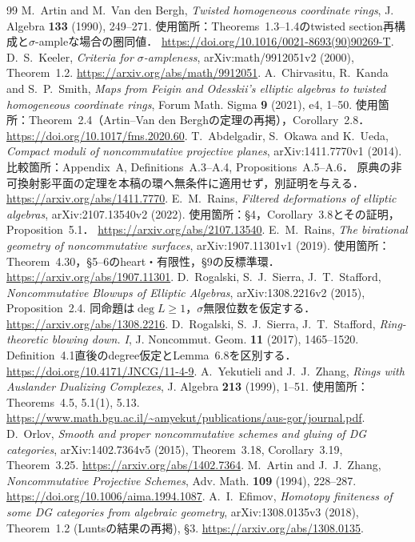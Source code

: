 \documentclass[11pt,a4paper]{ltjsarticle}
\theoremstyle{definition}
\begin{document}
\begin{thebibliography}{99}
M.~Artin and M.~Van den Bergh,
\emph{Twisted homogeneous coordinate rings},
J. Algebra \textbf{133} (1990), 249--271.
使用箇所：Theorems~1.3--1.4のtwisted section再構成と$\sigma$-ampleな場合の圏同値．
\url{https://doi.org/10.1016/0021-8693(90)90269-T}.
D.~S.~Keeler, \emph{Criteria for $\sigma$-ampleness},
arXiv:math/9912051v2 (2000), Theorem~1.2.
\url{https://arxiv.org/abs/math/9912051}.
A.~Chirvasitu, R.~Kanda and S.~P.~Smith,
\emph{Maps from Feigin and Odesskii's elliptic algebras to twisted homogeneous coordinate rings},
Forum Math. Sigma \textbf{9} (2021), e4, 1--50.
使用箇所：Theorem~2.4（Artin--Van den Berghの定理の再掲），Corollary~2.8．
\url{https://doi.org/10.1017/fms.2020.60}.
T.~Abdelgadir, S.~Okawa and K.~Ueda,
\emph{Compact moduli of noncommutative projective planes},
arXiv:1411.7770v1 (2014).
比較箇所：Appendix~A, Definitions~A.3--A.4, Propositions~A.5--A.6．
原典の非可換射影平面の定理を本稿の環へ無条件に適用せず，別証明を与える．
\url{https://arxiv.org/abs/1411.7770}.
E.~M.~Rains, \emph{Filtered deformations of elliptic algebras},
arXiv:2107.13540v2 (2022).
使用箇所：\S4，Corollary~3.8とその証明，Proposition~5.1．
\url{https://arxiv.org/abs/2107.13540}.
E.~M.~Rains, \emph{The birational geometry of noncommutative surfaces},
arXiv:1907.11301v1 (2019).
使用箇所：Theorem~4.30，\S5--6のheart・有限性，\S9の反標準環．
\url{https://arxiv.org/abs/1907.11301}.
D.~Rogalski, S.~J.~Sierra, J.~T.~Stafford,
\emph{Noncommutative Blowups of Elliptic Algebras},
arXiv:1308.2216v2 (2015), Proposition~2.4.
同命題は$\deg L\geq1$，$\sigma$無限位数を仮定する．
\url{https://arxiv.org/abs/1308.2216}.
D.~Rogalski, S.~J.~Sierra, J.~T.~Stafford,
\emph{Ring-theoretic blowing down. I},
J. Noncommut. Geom. \textbf{11} (2017), 1465--1520.
Definition~4.1直後のdegree仮定とLemma~6.8を区別する．
\url{https://doi.org/10.4171/JNCG/11-4-9}.
A.~Yekutieli and J.~J.~Zhang,
\emph{Rings with Auslander Dualizing Complexes},
J. Algebra \textbf{213} (1999), 1--51.
使用箇所：Theorems~4.5, 5.1(1), 5.13.
\url{https://www.math.bgu.ac.il/~amyekut/publications/aus-gor/journal.pdf}.
D.~Orlov, \emph{Smooth and proper noncommutative schemes and gluing of DG categories},
arXiv:1402.7364v5 (2015), Theorem~3.18, Corollary~3.19, Theorem~3.25.
\url{https://arxiv.org/abs/1402.7364}.
M.~Artin and J.~J.~Zhang,
\emph{Noncommutative Projective Schemes},
Adv. Math. \textbf{109} (1994), 228--287.
\url{https://doi.org/10.1006/aima.1994.1087}.
A.~I.~Efimov, \emph{Homotopy finiteness of some DG categories from algebraic geometry},
arXiv:1308.0135v3 (2018), Theorem~1.2 (Luntsの結果の再掲), \S3.
\url{https://arxiv.org/abs/1308.0135}.
\end{thebibliography}
\end{document}

